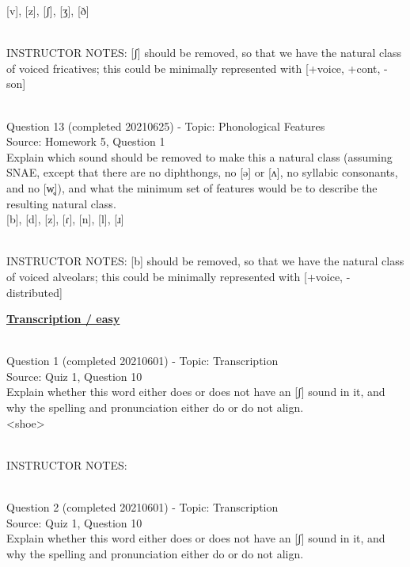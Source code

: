\documentclass[12pt]{article}
\begin{document}
{[v]}, {[z]}, {[ʃ]}, {[ʒ]}, {[ð]}


~\\
INSTRUCTOR NOTES: [ʃ] should be removed, so that we have the natural class of voiced fricatives; this could be minimally represented with [+voice, +cont, -son]


~\\

{\large Question 13} (completed 20210625) - Topic: Phonological Features\\
Source: Homework 5, Question 1\\

Explain which sound should be removed to make this a natural class (assuming SNAE, except that there are no diphthongs, no [ə] or [ʌ], no syllabic consonants, and no [w̥]), and what the minimum set of features would be to describe the resulting natural class.\\

{[b]}, {[d]}, {[z]}, {[ɾ]}, {[n]}, {[l]}, {[ɹ]}


~\\
INSTRUCTOR NOTES: [b] should be removed, so that we have the natural class of voiced alveolars; this could be minimally represented with [+voice, -distributed]


\newpage\textbf{\underline{\huge Transcription / easy\\}}

~\\

{\large Question 1} (completed 20210601) - Topic: Transcription\\
Source: Quiz 1, Question 10\\

Explain whether this word either does or does not have an [ʃ] sound in it, and why the spelling and pronunciation either do or do not align.\\

<shoe>


~\\
INSTRUCTOR NOTES: 


~\\

{\large Question 2} (completed 20210601) - Topic: Transcription\\
Source: Quiz 1, Question 10\\

Explain whether this word either does or does not have an [ʃ] sound in it, and why the spelling and pronunciation either do or do not align.\\
\end{document}
